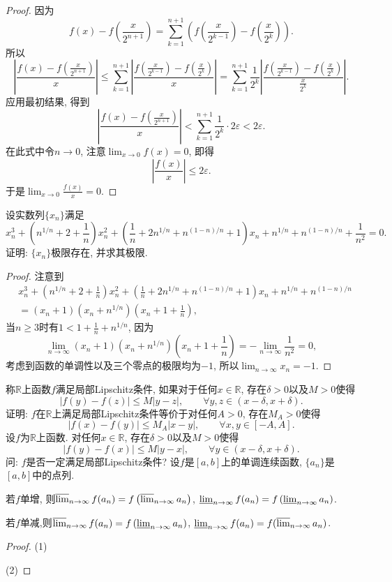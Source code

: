 \begin{quiza}
\begin{proof}
因为\[f(x)-f\left(\frac{x}{2^{n+1}}\right)=\sum_{k=1}^{n+1}\left(f\left(\frac{x}{2^{k-1}}\right)-f\left(\frac{x}{2^k}\right)\right).\]所以\[\left|\frac{f(x)-f\left(\frac{x}{2^{n+1}}\right)}{x}\right|\leqslant\sum_{k=1}^{n+1}\left|\frac{f\left(\frac{x}{2^{k-1}}\right)-f\left(\frac{x}{2^k}\right)}{x}\right|=\sum_{k=1}^{n+1}\frac{1}{2^k}\left|\frac{f\left(\frac{x}{2^{k-1}}\right)-f\left(\frac{x}{2^k}\right)}{\frac{x}{2^k}}\right|.\]应用最初结果, 得到\[\left|\frac{f(x)-f\left(\frac{x}{2^{n+1}}\right)}{x}\right|<\sum_{k=1}^{n+1}\frac{1}{2^k}\cdot 2\varepsilon<2\varepsilon.\]在此式中令\(n\rightarrow 0\), 注意\(\lim_{x\rightarrow 0}f(x)=0\), 即得\[\left|\frac{f(x)}{x}\right|\leqslant 2\varepsilon.\]于是\(\lim_{x\rightarrow 0}\frac{f(x)}{x}=0.\)
\end{proof}
\woe  设实数列\(\{x_n\}\)满足\[x_n^3+\left(n^{1/n}+2+\frac{1}{n}\right)x_n^2+\left(\frac{1}{n}+2n^{1/n}+n^{(1-n)/n}+1\right)x_n+n^{1/n}+n^{(1-n)/n}+\frac{1}{n^2}=0.\]证明: \(\{x_n\}\)极限存在, 并求其极限.
\begin{proof}
注意到\[\begin{split}
&x_n^3+\left(n^{1/n}+2+\frac{1}{n}\right)x_n^2+\left(\frac{1}{n}+2n^{1/n}+n^{(1-n)/n}+1\right)x_n+n^{1/n}+n^{(1-n)/n}\\&=(x_n+1)(x_n+n^{1/n})(x_n+1+\frac{1}{n}),
\end{split}\]当\(n\geqslant 3\)时有\(1<1+\frac{1}{n}+n^{1/n}\), 因为\[\lim_{n\rightarrow\infty}(x_n+1)(x_n+n^{1/n})(x_n+1+\frac{1}{n})=-\lim_{n\rightarrow\infty}\frac{1}{n^2}=0,\]考虑到函数的单调性以及三个零点的极限均为\(-1\), 所以\(\lim_{n\rightarrow\infty}x_n=-1.\)
\end{proof}
\woe 称\(\mathbb{R}\)上函数\(f\)满足局部Lipschitz条件, 如果对于任何\(x\in\mathbb{R}\), 存在\(\delta>0\)以及\(M>0\)使得\[|f(y)-f(z)|\leqslant M|y-z|,\qquad\forall y,z\in(x-\delta,x+\delta).\]证明: \(f\)在\(\mathbb{R}\)上满足局部Lipschitz条件等价于对任何\(A>0\), 存在\(M_A>0\)使得\[|f(x)-f(y)|\leqslant M_A|x-y|,\qquad \forall x,y\in[-A,A].\]
\woe 设\(f\)为\(\mathbb{R}\)上函数. 对任何\(x\in\mathbb{R}\), 存在\(\delta>0\)以及\(M>0\)使得\[|f(y)-f(x)|\leqslant M|y-x|,\qquad\forall y\in (x-\delta,x+\delta).\]问: \(f\)是否一定满足局部Lipschitz条件?
\woe 设\(f\)是\([a,b]\)上的单调连续函数, \(\{a_n\}\)是\([a,b]\)中的点列.
\begin{quizs}
    \item 若\(f\)单增, 则\(\varlimsup_{n\rightarrow\infty}f(a_n)=f\left(\varlimsup_{n\rightarrow\infty}a_n\right)\), \(\varliminf_{n\rightarrow\infty}f(a_n)=f\left(\varliminf_{n\rightarrow\infty}a_n\right)\).
    \item 若\(f\)单减,则\(\varlimsup_{n\rightarrow\infty}f(a_n)=f\left(\varliminf_{n\rightarrow\infty}a_n\right)\), \(\varliminf_{n\rightarrow\infty}f(a_n)=f(\varlimsup_{n\rightarrow\infty}a_n)\).
\end{quizs}
\begin{proof}
	(1)
	
	(2)
\end{proof}
\end{quiza}
